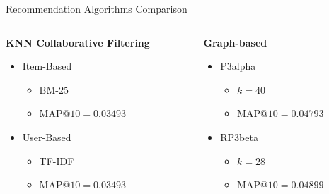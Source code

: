 \documentclass{beamer}
\begin{document}
\begin{frame}{Recommendation Algorithms Comparison}
  \begin{columns}[t]
    \begin{column}{0.5\textwidth}
      \textbf{KNN Collaborative Filtering}
      \begin{itemize}
        \item Item-Based
        \begin{itemize}
          \item BM-25
          \item $\text{MAP@}10=0.03493$
        \end{itemize}
        \item User-Based
        \begin{itemize}
          \item TF-IDF
          \item $\text{MAP@}10=0.03493$
        \end{itemize}
      \end{itemize}
    \end{column}
    
    \begin{column}{0.5\textwidth}
      \textbf{Graph-based}
      \begin{itemize}
        \item P3alpha
        \begin{itemize}
            \item $k=40$
            \item $\text{MAP@}10=0.04793$
        \end{itemize}
        \item RP3beta
        \begin{itemize}
          \item $k=28$
          \item $\text{MAP@}10=0.04899$
        \end{itemize}
      \end{itemize}
    \end{column}
  \end{columns}
\end{frame}
\end{document}

